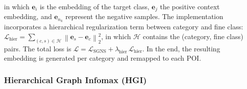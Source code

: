 in which $\mathbf{e}_i$ is the embedding of the target class, $\mathbf{e}_j$ the positive context embedding, and $\mathbf{e}_{n_k}$ represent the negative samples. The implementation incorporates a hierarchical regularization term \cite{Xu2023} between category and fine class: $\mathcal{L}_{\text{hier}} = \sum_{(c,s) \in \mathcal{H}} \left\| \mathbf{e}_s - \mathbf{e}_c \right\|_2^2$, in which $\mathcal{H}$ contains the (category, fine class) pairs. The total loss is $\mathcal{L} = \mathcal{L}_{\text{SGNS}} + \lambda_{\text{hier}} \, \mathcal{L}_{\text{hier}}$. In the end, the resulting embedding is generated per category and remapped to each POI.

\subsubsection{Hierarchical Graph Infomax (HGI)}

